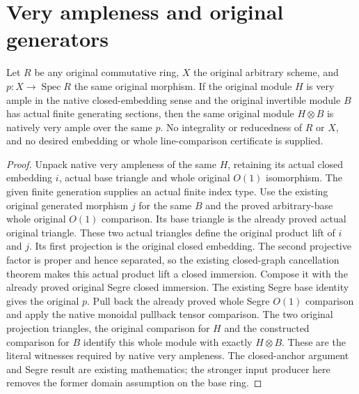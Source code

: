 \section{Very ampleness and original generators}

\begin{theorem}
\label{thm:general-native-veryample-tensor-original-finite-generators}
\leanok
Let $R$ be any original commutative ring, $X$ the original arbitrary
scheme, and $p:X\to\operatorname{Spec}R$ the same original morphism.
If the original module $H$ is very ample in the native closed-embedding
sense and the original invertible module $B$ has actual finite generating
sections, then the same original module $H\otimes B$ is natively very
ample over the same $p$. No integrality or reducedness of $R$ or $X$, and
no desired embedding or whole line-comparison certificate is supplied.
\end{theorem}
\begin{proof}
Unpack native very ampleness of the same $H$, retaining its actual closed
embedding $i$, actual base triangle and whole original $O(1)$ isomorphism.
The given finite generation supplies an actual finite index type. Use
the existing original generated morphism $j$ for the same $B$ and the
proved arbitrary-base whole original $O(1)$ comparison. Its base triangle
is the already proved actual original triangle. These two actual
triangles define the original product lift of $i$ and $j$. Its first
projection is the original closed embedding. The second projective
factor is proper and hence separated, so the existing closed-graph
cancellation theorem makes this actual product lift a closed immersion.
Compose it with the already proved original Segre closed immersion.
The existing Segre base identity gives the original $p$. Pull back the
already proved whole Segre $O(1)$ comparison and apply the native monoidal
pullback tensor comparison. The two original projection triangles,
the original comparison for $H$ and the constructed comparison for $B$
identify this whole module with exactly $H\otimes B$. These are the
literal witnesses required by native very ampleness. The closed-anchor
argument and Segre result are existing mathematics; the stronger input
producer here removes the former domain assumption on the base ring.
\end{proof}


